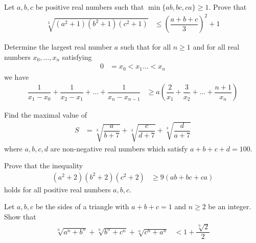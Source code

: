 \documentclass{subfile}
\begin{document}
		\begin{problem}
			Let $a,b,c$ be positive real numbers such that $\min\{ab,bc,ca\}\geq1$. Prove that
				\begin{align*}
					\sqrt[3]{(a^2+1)(b^2+1)(c^2+1)}
						& \leq\left(\dfrac{a+b+c}{3}\right)^2+1
				\end{align*}
		\end{problem}
	
		\begin{problem}
			Determine the largest real number $a$ such that for all $n\geq1$ and for all real numbers $x_{0},\ldots,x_{n}$ satisfying
				\begin{align*}
					0
						& = x_{0}<x_{1}\ldots<x_{n}
				\end{align*}
			we have
				\begin{align*}
					\dfrac{1}{x_{1}-x_{0}}+\dfrac{1}{x_{2}-x_{1}}+\ldots+\dfrac{1}{x_{n}-x_{n-1}}
						& \geq a\left(\dfrac{2}{x_{1}}+\dfrac{3}{x_{2}}+\ldots+\dfrac{n+1}{x_{n}}\right)
				\end{align*}
		\end{problem}
	
		\begin{problem}
			Find the maximal value of
				\begin{align*}
					S
						& = \sqrt[3]{\dfrac{a}{b+7}}+\sqrt[3]{\dfrac{c}{d+7}}+\sqrt[3]{\dfrac{d}{a+7}}
				\end{align*}
			where $a,b,c,d$ are non-negative real numbers which satisfy $a+b+c+d=100$.
		\end{problem}
	
		\begin{problem}
			Prove that the inequality
				\begin{align*}
					(a^{2}+2)(b^{2}+2)(c^{2}+2)
						& \geq9(ab+bc+ca)
				\end{align*}
			holds for all positive real numbers $a,b,c$.
		\end{problem}
	
		\begin{problem}
			Let $a,b,c$ be the sides of a triangle with $a+b+c=1$ and $n\geq2$ be an integer. Show that
				\begin{align*}
					\sqrt[n]{a^{n}+b^{n}}+\sqrt[n]{b^{n}+c^{n}}+\sqrt[n]{c^{n}+a^{n}}
						& < 1+\dfrac{\sqrt[n]{2}}{2}
				\end{align*}
		\end{problem}
	
\end{document}
